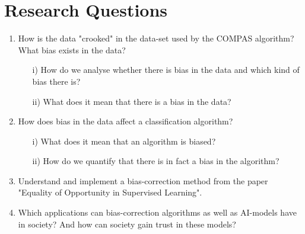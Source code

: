 \documentclass[11pt, fleqn]{article}
\begin{document}
	\section*{Research Questions}
	\vspace*{-0.2cm}
	\begin{enumerate}
		\item How is the data "crooked" in the data-set used by the COMPAS algorithm? What bias exists in the data?
		\begin{itemize}
			\item[i)] How do we analyse whether there is bias in the data and which kind of bias there is? 
			\item[ii)] What does it mean that there is a bias in the data?
		\end{itemize}
		
		\item How does bias in the data affect a classification algorithm?
		\begin{itemize}
			\item[i)] What does it mean that an algorithm is biased?
			\item[ii)] How do we quantify that there is in fact a bias in the algorithm?
		\end{itemize}
		
		\item Understand and implement a bias-correction method from the paper "Equality of Opportunity in Supervised Learning". 
		
		\item Which applications can bias-correction algorithms as well as AI-models have in society? And how can society gain trust in these models? 
		
		
	\end{enumerate}
	
\end{document}
